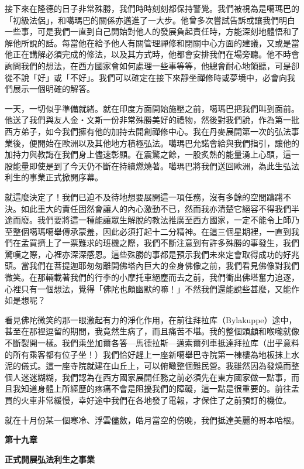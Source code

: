 接下來在隆德的日子非常殊勝，我們時時刻刻都保持警覺。我們被視為是噶瑪巴的「初級法侶」，和噶瑪巴的關係亦邁進了一大步。他曾多次嘗試告訴或讓我們明白一些事，可是我們一直到自己開始對他人的發展負起責任時，方能深刻地體悟和了解他所說的話。每當他在給予他人有關管理禪修和閉關中心方面的建議，又或是當他正在講解必須完成的修法，以及其方式時，他都會安排我們在場旁聽。他不時會詢問我們的想法，在西方國家會如何處理一些事等等，他總會耐心地領聽，可是卻從不說「好」或「不好」。我們可以確定在接下來靜坐禪修時或夢境中，必會向我們展示一個明確的解答。

一天，一切似乎準備就緒。就在印度方面開始施壓之前，噶瑪巴把我們叫到面前。他送了我們與友人金‧文斯一份非常殊勝美好的禮物，然後對我們說，作為第一批西方弟子，如今我們擁有他的加持去開創禪修中心。我在丹麥展開第一次的弘法事業後，便開始在歐洲以及其他地方積極弘法。噶瑪巴允諾會給與我們指引，讓他的加持力與教誨在我們身上儘速彰顯。在震驚之餘，一股炙熱的能量湧上心頭，這一股能量即使是到了今天仍不斷在持續燃燒著。噶瑪巴將我們送回歐洲，為此生弘法利生的事業正式掀開序幕。

就這麼決定了！我們已迫不及待地想要展開這一項任務，沒有多餘的空間躊躇不決。如此重大的責任固然會讓人的內心激動不已，然而我亦清楚它絕容不得我們半途而廢。我們要將這一種能讓眾生解脫的教法推廣至西方國家，一定不能令上師乃至整個噶瑪噶舉傳承蒙羞，因此必須打起十二分精神。在這三個星期裡，一直到我們在孟買擠上了一票難求的班機之際，我們不斷注意到有許多殊勝的事發生，我們驚嘆之際，心裡亦深深感恩。這些殊勝的事都是預示我們未來定會取得成功的好兆頭。當我們在菩提迦耶匆匆離開佛塔內巨大的金身佛像之前，我們看見佛像對我們微笑。在那輛載著我們的行李的小摩托車絕塵而去之前，我們衝出佛塔奮力追逐，心裡只有一個想法，覺得「佛陀也頗幽默的嘛！」不然我們還能說些甚麼，又能作如是想呢？

看見佛陀微笑的那一眼激起有力的淨化作用，在前往拜拉库（Bylakuppe）途中，甚至在那裡逗留的期間，我竟然生病了，而且痛苦不堪。我的整個頭顱和喉嚨就像不斷裂開一樣。我們乘坐加爾各答---馬德拉斯---邁索爾列車抵達拜拉库（出乎意料的所有乘客都有位子坐！）我們恰好趕上一座新噶舉巴寺院第一棟樓為地板抹上水泥的儀式。這一座寺院就建在山丘上，可以俯瞰整個難民營。我雖然因為發燒而整個人迷迷糊糊，我們認為在西方國家展開任務之前必須先在東方國家做一點事，而且我知道身體上所經歷的疼痛不會是阻擾我們的障礙，這一點是很重要的。前往孟買的火車非常緩慢，幸好途中我們在各地發了電報，才保住了之前預訂的機位。

就在十月份某一個寒冷、浮雲儘斂，皓月當空的傍晚，我們抵達美麗的哥本哈根。

\textbf{第十九章}

\textbf{正式開展弘法利生之事業}

